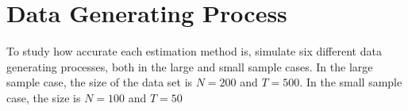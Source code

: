 
\section{Data Generating Process} \label{sec::dgp}

To study how accurate each estimation method is, \citeauthor{carrasco2016sample} simulate six different data generating processes, both in the large and small sample cases. In the large sample case, the size of the data set is $N = 200$ and $T = 500$. In the small sample case, the size is $N = 100$ and $T = 50$





